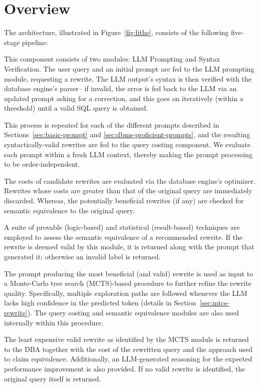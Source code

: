 \section{\lithe Overview}
\label{sec:lithe-architecture}

The \lithe architecture, illustrated in Figure~\ref{fig:lithe}, consists of the following five-stage pipeline:

%
This component consists of two modules: LLM Prompting and Syntax Verification.
%
The user query and an initial prompt are fed to the LLM prompting module, requesting a rewrite. The LLM output's syntax is then verified with the database engine's parser-- if invalid, the error is fed back to the LLM via an updated prompt asking for a correction, and this goes on iteratively (within a threshold) until a valid SQL query is obtained. 

This process is repeated for each of the different prompts described in Sections~\ref{sec:basic-prompt} and \ref{sec:dbms-proficient-prompts}, and the resulting syntactically-valid rewrites are fed to the query costing component.
We evaluate each prompt within a fresh LLM context, thereby making the prompt processing to be order-independent. 

%
The costs of candidate rewrites are evaluated via the database engine's optimizer. Rewrites whose costs are greater than that of the original query are immediately discarded. Whereas, the potentially beneficial rewrites (if any) are checked for semantic equivalence to the original query.

%
A suite of provable (logic-based) and statistical (result-based) techniques are employed to assess the semantic equivalence of a recommended rewrite.
%
If the rewrite is deemed valid by this module, it is returned along with the prompt that generated it; otherwise an invalid label is returned.

%
The prompt producing the most beneficial (and valid) rewrite is used as input to a Monte-Carlo tree search (MCTS)-based procedure to further refine the rewrite quality. Specifically, multiple exploration paths are followed whenever the LLM lacks high confidence in the predicted token (details in Section~\ref{sec:mtcs-rewrite}). The query costing and semantic equivalence modules are also used internally within this procedure.
%

The least expensive valid rewrite as identified by the MCTS module is returned to the DBA together with the cost of the rewritten query and the approach used to claim equivalence. Additionally, an LLM-generated reasoning for the expected performance improvement is also provided. 
If no valid rewrite is identified, the original query itself is returned.

